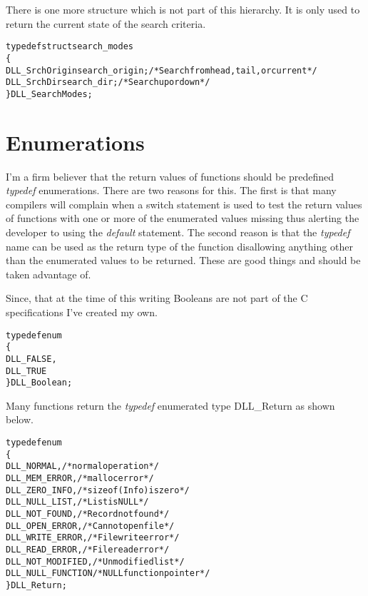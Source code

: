 \documentclass[10pt,letterpaper,titlepage]{article}
\begin{document}
\noindent
There is one more structure which is not part of this hierarchy.  It is only used to return the current state of the search criteria.

\small
\begin{alltt}
typedef struct search_modes
   \{
   DLL_SrchOrigin search_origin; /* Search from head, tail, or current */
   DLL_SrchDir    search_dir;    /* Search up or down */
   \} DLL_SearchModes;
\end{alltt}
\normalsize
\pagebreak

\section{Enumerations}
I'm a firm believer that the return values of functions should be predefined \emph{typedef} enumerations.  There are two reasons for this.  The first is that many compilers will complain when a switch statement is used to test the return values of functions with one or more of the enumerated values missing thus alerting the developer to using the \emph{default} statement.   The second reason is that the \emph{typedef} name can be used as the return type of the function disallowing anything other than the enumerated values to be returned.  These are good things and should be taken advantage of.
\vspace{8pt}

\noindent
Since, that at the time of this writing Booleans are not part of the C specifications I've created my own.

\small
\begin{alltt}
typedef enum
   \{
   DLL_FALSE,
   DLL_TRUE
   \} DLL_Boolean;
\end{alltt}
\normalsize
\vspace{8pt}

\noindent
Many functions return the \emph{typedef} enumerated type DLL\_Return as shown below.

\small
\begin{alltt}
typedef enum
   \{
   DLL_NORMAL,            /* normal operation */
   DLL_MEM_ERROR,         /* malloc error */
   DLL_ZERO_INFO,         /* sizeof(Info) is zero */
   DLL_NULL_LIST,         /* List is NULL */
   DLL_NOT_FOUND,         /* Record not found */
   DLL_OPEN_ERROR,        /* Cannot open file */
   DLL_WRITE_ERROR,       /* File write error */
   DLL_READ_ERROR,        /* File read error */
   DLL_NOT_MODIFIED,      /* Unmodified list */
   DLL_NULL_FUNCTION      /* NULL function pointer */
   \} DLL_Return;
\end{alltt}
\normalsize
\vspace{8pt}
\end{document}

